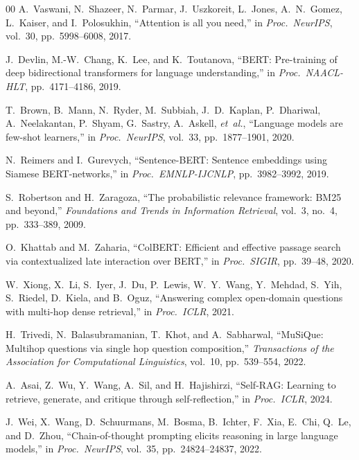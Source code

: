 \documentclass[conference]{IEEEtran}
\begin{document}
\begin{thebibliography}{00}
A.~Vaswani, N.~Shazeer, N.~Parmar, J.~Uszkoreit, L.~Jones, A.~N.~Gomez, L.~Kaiser, and I.~Polosukhin, ``Attention is all you need,'' in \textit{Proc.~NeurIPS}, vol.~30, pp.~5998--6008, 2017.

J.~Devlin, M.-W.~Chang, K.~Lee, and K.~Toutanova, ``BERT: Pre-training of deep bidirectional transformers for language understanding,'' in \textit{Proc.~NAACL-HLT}, pp.~4171--4186, 2019.

T.~Brown, B.~Mann, N.~Ryder, M.~Subbiah, J.~D.~Kaplan, P.~Dhariwal, A.~Neelakantan, P.~Shyam, G.~Sastry, A.~Askell, \textit{et~al.}, ``Language models are few-shot learners,'' in \textit{Proc.~NeurIPS}, vol.~33, pp.~1877--1901, 2020.

N.~Reimers and I.~Gurevych, ``Sentence-BERT: Sentence embeddings using Siamese BERT-networks,'' in \textit{Proc.~EMNLP-IJCNLP}, pp.~3982--3992, 2019.

S.~Robertson and H.~Zaragoza, ``The probabilistic relevance framework: BM25 and beyond,'' \textit{Foundations and Trends in Information Retrieval}, vol.~3, no.~4, pp.~333--389, 2009.

O.~Khattab and M.~Zaharia, ``ColBERT: Efficient and effective passage search via contextualized late interaction over BERT,'' in \textit{Proc.~SIGIR}, pp.~39--48, 2020.

W.~Xiong, X.~Li, S.~Iyer, J.~Du, P.~Lewis, W.~Y.~Wang, Y.~Mehdad, S.~Yih, S.~Riedel, D.~Kiela, and B.~Oguz, ``Answering complex open-domain questions with multi-hop dense retrieval,'' in \textit{Proc.~ICLR}, 2021.

H.~Trivedi, N.~Balasubramanian, T.~Khot, and A.~Sabharwal, ``MuSiQue: Multihop questions via single hop question composition,'' \textit{Transactions of the Association for Computational Linguistics}, vol.~10, pp.~539--554, 2022.

A.~Asai, Z.~Wu, Y.~Wang, A.~Sil, and H.~Hajishirzi, ``Self-RAG: Learning to retrieve, generate, and critique through self-reflection,'' in \textit{Proc.~ICLR}, 2024.

J.~Wei, X.~Wang, D.~Schuurmans, M.~Bosma, B.~Ichter, F.~Xia, E.~Chi, Q.~Le, and D.~Zhou, ``Chain-of-thought prompting elicits reasoning in large language models,'' in \textit{Proc.~NeurIPS}, vol.~35, pp.~24824--24837, 2022.


\end{thebibliography}
\end{document}
